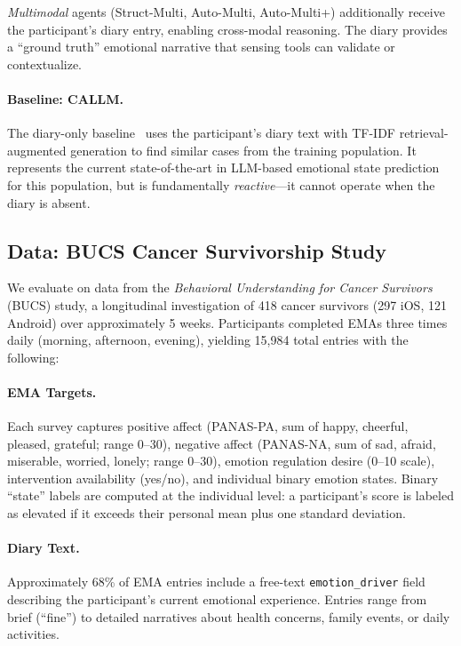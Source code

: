 \documentclass[screen,review,anonymous]{acmart}
\begin{document}
\emph{Multimodal} agents (Struct-Multi, Auto-Multi, Auto-Multi+) additionally receive the participant's diary entry, enabling cross-modal reasoning. The diary provides a ``ground truth'' emotional narrative that sensing tools can validate or contextualize.

\paragraph{Baseline: CALLM.}
The diary-only baseline~\cite{wang2026callm} uses the participant's diary text with TF-IDF retrieval-augmented generation to find similar cases from the training population. It represents the current state-of-the-art in LLM-based emotional state prediction for this population, but is fundamentally \emph{reactive}---it cannot operate when the diary is absent.

\subsection{Data: BUCS Cancer Survivorship Study}

We evaluate on data from the \emph{Behavioral Understanding for Cancer Survivors} (BUCS) study, a longitudinal investigation of 418 cancer survivors (297 iOS, 121 Android) over approximately 5 weeks. Participants completed EMAs three times daily (morning, afternoon, evening), yielding 15,984 total entries with the following:

\paragraph{EMA Targets.}
Each survey captures positive affect (PANAS-PA, sum of happy, cheerful, pleased, grateful; range 0--30), negative affect (PANAS-NA, sum of sad, afraid, miserable, worried, lonely; range 0--30), emotion regulation desire (0--10 scale), intervention availability (yes/no), and individual binary emotion states. Binary ``state'' labels are computed at the individual level: a participant's score is labeled as elevated if it exceeds their personal mean plus one standard deviation.

\paragraph{Diary Text.}
Approximately 68\% of EMA entries include a free-text \texttt{emotion\_driver} field describing the participant's current emotional experience. Entries range from brief (``fine'') to detailed narratives about health concerns, family events, or daily activities.
\end{document}
